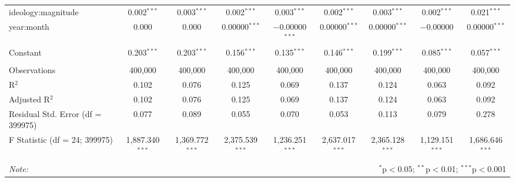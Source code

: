 \begin{table}[!htbp]
\begin{tabular}{@{\extracolsep{5pt}}lcccccccc}
  ideology:magnitude & 0.002$^{***}$ & 0.003$^{***}$ & 0.002$^{***}$ & 0.003$^{***}$ & 0.002$^{***}$ & 0.003$^{***}$ & 0.002$^{***}$ & 0.021$^{***}$ \\ 
  year:month & 0.000 & 0.000 & 0.00000$^{***}$ & $-$0.00000$^{***}$ & 0.00000$^{***}$ & 0.00000$^{***}$ & $-$0.00000 & 0.00000$^{***}$ \\ 
  Constant & 0.203$^{***}$ & 0.203$^{***}$ & 0.156$^{***}$ & 0.135$^{***}$ & 0.146$^{***}$ & 0.199$^{***}$ & 0.085$^{***}$ & 0.057$^{***}$ \\ 
 \hline \\[-1.8ex] 
Observations & 400,000 & 400,000 & 400,000 & 400,000 & 400,000 & 400,000 & 400,000 & 400,000 \\ 
R$^{2}$ & 0.102 & 0.076 & 0.125 & 0.069 & 0.137 & 0.124 & 0.063 & 0.092 \\ 
Adjusted R$^{2}$ & 0.102 & 0.076 & 0.125 & 0.069 & 0.137 & 0.124 & 0.063 & 0.092 \\ 
Residual Std. Error (df = 399975) & 0.077 & 0.089 & 0.055 & 0.070 & 0.053 & 0.113 & 0.079 & 0.278 \\ 
F Statistic (df = 24; 399975) & 1,887.340$^{***}$ & 1,369.772$^{***}$ & 2,375.539$^{***}$ & 1,236.251$^{***}$ & 2,637.017$^{***}$ & 2,365.128$^{***}$ & 1,129.151$^{***}$ & 1,686.646$^{***}$ \\ 
\hline 
\hline \\[-1.8ex] 
\textit{Note:}  & \multicolumn{8}{r}{$^{*}$p$<$0.05; $^{**}$p$<$0.01; $^{***}$p$<$0.001} \\ 
\end{tabular} 
\end{table} 
